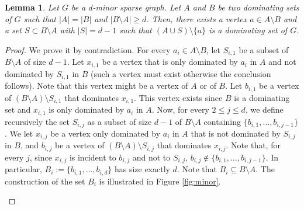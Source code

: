 \documentclass[10pt]{article}
\newtheorem{lemma}[theorem]{Lemma}
\begin{document}
\begin{lemma}\label{lem:contradiction}
Let $G$ be a $d$-minor sparse graph.
Let $A$ and $B$ be two dominating sets of $G$ such that $|A|=|B|$ and $|B\setminus A|\geq d$. Then, there exists a vertex $a \in A\setminus B$ and a set $S \subset B\setminus A$ with $|S|=d-1$ such that $(A \cup S) \setminus \{a\}$ is a dominating set of $G$.
\end{lemma}
\begin{proof}
We prove it by contradiction.
For every $a_i\in A\setminus B$, let $S_{i,1}$ be a subset of $B\setminus A$ of size $d-1$. Let $x_{i,1}$ be a vertex that is only dominated by $a_i$ in $A$ and not dominated by $S_{i,1}$ in $B$ (such a vertex must exist otherwise the conclusion follows). Note that this vertex might be a vertex of $A$ or of $B$.
Let $b_{i,1}$ be a vertex of $(B\setminus A)\setminus S_{i,1}$ that dominates $x_{i,1}$. This vertex exists since $B$ is a dominating set and $x_{i,1}$ is only dominated by $a_i$ in $A$. Now, for every $2\leq j\leq d$, we define recursively the set $S_{i,j}$ as a subset of size $d-1$ of $B\setminus A$ containing $\{b_{i,1},\ldots,b_{i,j-1}\}$. We let $x_{i,j}$ be a vertex only dominated by $a_i$ in $A$ that is not dominated by $S_{i,j}$ in $B$, and $b_{i,j}$ be a vertex of $(B\setminus A)\setminus S_{i,j}$ that dominates $x_{i,j}$. Note that, for every $j$, since $x_{i,j}$ is incident to $b_{i,j}$ and not to  $S_{i,j}$, $b_{i,j} \notin \{ b_{i,1},\ldots,b_{i,j-1} \}$. In particular, $B_i:=\{b_{i,1},\ldots,b_{i,d}\}$ has size exactly $d$. Note that $B_i \subseteq B \setminus A$. The construction of the set $B_i$ is illustrated in Figure \ref{fig:minor}.

\begin{figure}[bt]
	\centering
\end{figure}
\end{proof}
\end{document}
